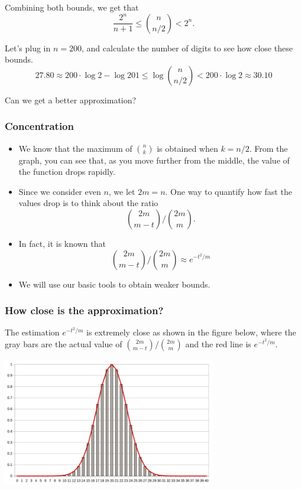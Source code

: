 \begin{frame}
  Combining both bounds, we get that
  \[\frac{2^n}{n+1}\leq \binom{n}{n/2} < 2^n.\]

  \pause Let's plug in $n=200$, and calculate the number of digits to
  see how close these bounds.
  \[27.80 \approx 200\cdot\log 2 - \log 201 \leq \log\binom{n}{n/2} < 200\cdot \log 2\approx 30.10\]
  \pause

  Can we get a better approximation?
\end{frame}

\begin{frame}\frametitle{Concentration}
  \begin{itemize}
  \item We know that the maximum of $\binom{n}{k}$ is obtained when
    $k=n/2$.  From the graph, you can see that, as you move further
    from the middle, the value of the function drops rapidly.
  \item Since we consider even $n$, we let $2m=n$.  One way to
    quantify how fast the values drop is to think about the ratio
    \[ \binom{2m}{m-t}\Big/\binom{2m}{m}. \] \pause
  \item In fact, it is known that
    \[ \binom{2m}{m-t}\Big/\binom{2m}{m} \approx e^{-t^2/m} \]
    \pause
  \item We will use our basic tools to obtain weaker bounds.
  \end{itemize}
\end{frame}

\begin{frame}\frametitle{How close is the approximation?}
  The estimation $e^{-t^2/m}$ is extremely close as shown in the
  figure below, where the gray bars are the actual value of
  $\binom{2m}{m-t}/\binom{2m}{m}$ and the red line is $e^{-t^2/m}$.

  \includegraphics[height=2.2in]{images/binom-approx.png}
\end{frame}

